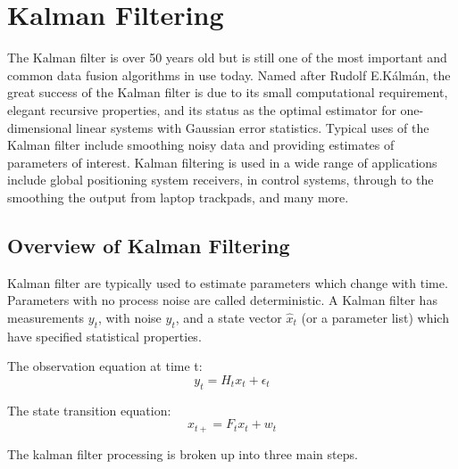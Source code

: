 \chapter{Kalman Filtering}
\label{ch:kalman_filter}
%
The Kalman filter is over 50 years old but is still one of the most important and common data fusion algorithms in use today. 
Named after Rudolf E.Kálmán, the great success of the Kalman filter is due to its small computational requirement, elegant recursive properties, and its status as the optimal estimator for one-dimensional linear systems with Gaussian error statistics. 
Typical uses of the Kalman filter include smoothing noisy data and providing estimates of parameters of interest. 
Kalman filtering is used in a wide range of applications include global positioning system receivers, in control systems, through to the smoothing the output from laptop trackpads, and many more.

\section{Overview of Kalman Filtering}

Kalman filter are typically used to estimate parameters which change with time. 
Parameters with no process noise are called deterministic.
A Kalman filter has measurements $y_t$, with noise $y_t$, and a state vector $\hat x_t$ (or a parameter list) which have specified statistical properties.

The observation equation at time t:
\begin{equation}
    y_t = H_t x_t + \epsilon_t	 \label{eq:kfObs}
\end{equation}

The state transition equation:
\begin{equation}
    x_{t+} = F_t x_t + w_t	
\end{equation}

The kalman filter processing is broken up into three main steps.

